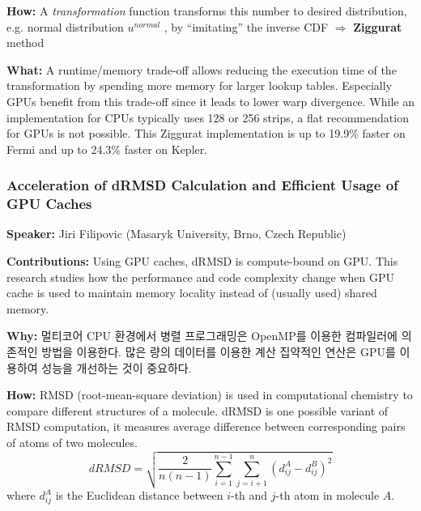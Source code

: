 \documentclass[twocolumn]{article}
\begin{document}
\noindent
\textbf{How:}  A \textit{transformation} function transforms this number to desired distribution, e.g. normal distribution $u^{normal}$ , by “imitating” the inverse CDF $\Rightarrow$ \textbf{Ziggurat} method 

\noindent
\textbf{What:}  A runtime/memory trade-off allows reducing the execution time of the transformation by spending more memory for larger lookup tables. Especially GPUs benefit from this trade-off since it leads to lower warp divergence. While an implementation for CPUs typically uses 128 or 256 strips, a flat recommendation for GPUs is not possible. This Ziggurat implementation is up to 19.9\% faster on Fermi and up to 24.3\% faster on Kepler.

%
%
%
%

\subsubsection{Acceleration of dRMSD Calculation and Efficient Usage of GPU Caches}
\textbf{Speaker:} Jiri Filipovic (Masaryk University, Brno, Czech Republic)

\noindent
\textbf{Contributions:}  Using GPU caches, dRMSD is compute-bound on GPU.
This research studies how the performance and code complexity change when GPU cache is used to maintain memory locality instead of (usually used) shared memory.

\noindent
\textbf{Why:}  멀티코어 CPU 환경에서 병렬 프로그래밍은 OpenMP를 이용한 컴파일러에 의존적인 방법을 이용한다. 많은 량의 데이터를 이용한 계산 집약적인 연산은 GPU를 이용하여 성능을 개선하는 것이 중요하다.

\noindent
\textbf{How:}  
RMSD (root-mean-square deviation) is used in computational chemistry to compare different structures of a molecule.
dRMSD is one possible variant of RMSD computation, it measures average difference between corresponding pairs of atoms of two molecules.
\begin{equation}
dRMSD = \sqrt{\frac{2}{n(n-1)} \sum_{i=1}^{n-1}\sum_{j=i+1}^{n}(d_{ij}^A-d_{ij}^B)^2}
\end{equation}
where $d_{ij}^A$ is the Euclidean distance between $i$-th and $j$-th atom in molecule $A$.
\end{document}

